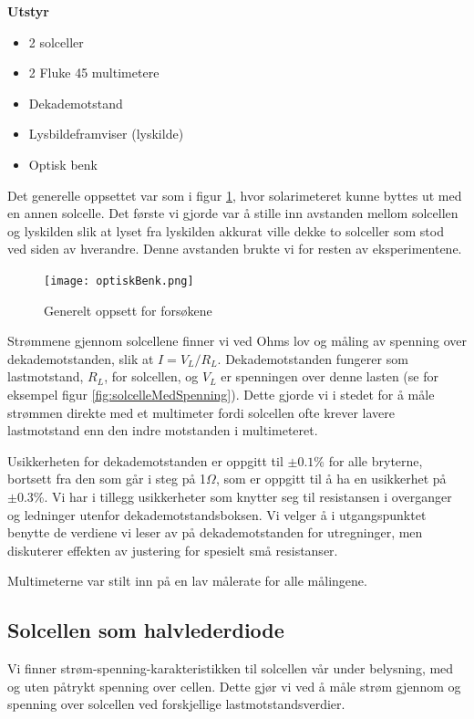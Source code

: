 \documentclass[a4paper,11pt, twocolumn]{article}
\begin{document}
{\bf Utstyr}
\begin{itemize}
	\item 2 solceller
	\item 2 Fluke 45 multimetere
	\item Dekademotstand
	\item Lysbildeframviser (lyskilde)
	\item Optisk benk
\end{itemize}

Det generelle oppsettet var som i figur \ref{fig:oppsett}, hvor solarimeteret kunne byttes ut med en annen solcelle. Det første vi gjorde var å stille inn avstanden mellom solcellen og lyskilden slik at lyset fra lyskilden akkurat ville dekke to solceller som stod ved siden av hverandre. Denne avstanden brukte vi for resten av eksperimentene.
\begin{figure}[ht!]
	\texttt{[image: optiskBenk.png]}
	\caption{Generelt oppsett for forsøkene}
	\label{fig:oppsett}
\end{figure}
Strømmene gjennom solcellene finner vi ved Ohms lov og måling av spenning over dekademotstanden, slik at $I = V_L/R_L$. Dekademotstanden fungerer som lastmotstand, $R_L$, for solcellen, og $V_L$ er spenningen over denne lasten (se for eksempel figur \ref{fig:solcelleMedSpenning}). Dette gjorde vi i stedet for å måle strømmen direkte med et multimeter fordi solcellen ofte krever lavere lastmotstand enn den indre motstanden i multimeteret. 

Usikkerheten for dekademotstanden er oppgitt til $\pm0.1$\% for alle bryterne, bortsett fra den som går i steg på 1$\Omega$, som er oppgitt til å ha en usikkerhet på $\pm0.3$\%. Vi har i tillegg usikkerheter som knytter seg til resistansen i overganger og ledninger utenfor dekademotstandsboksen. Vi velger å i utgangspunktet benytte de verdiene vi leser av på dekademotstanden for utregninger, men diskuterer effekten av justering for spesielt små resistanser.

Multimeterne var stilt inn på en lav målerate for alle målingene.
\subsection{Solcellen som halvlederdiode}
Vi finner strøm-spenning-karakteristikken til solcellen vår under belysning, med og uten påtrykt spenning over cellen. Dette gjør vi ved å måle strøm gjennom og spenning over solcellen ved forskjellige lastmotstandsverdier. 
\end{document}
